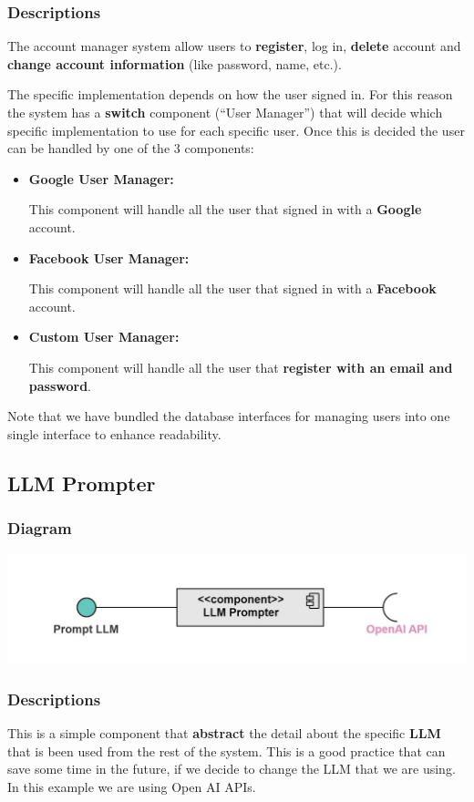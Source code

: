 \documentclass{article}
\begin{document}
\subsubsection{Descriptions}
The account manager system allow users to \textbf{register}, log in, \textbf{delete} account and \textbf{change account information} (like password, name, etc.).

The specific implementation depends on how the user signed in. For this reason the system has a \textbf{switch} component (``User Manager'')
that will decide which specific implementation to use for each specific user. Once this is decided the user
can be handled by one of the 3 components:
\begin{itemize}
    \item \textbf{Google User Manager: }

          This component will handle all the user that signed in with a \textbf{Google} account.
    \item \textbf{Facebook User Manager: }

          This component will handle all the user that signed in with a \textbf{Facebook} account.
    \item \textbf{Custom User Manager: }

          This component will handle all the user that \textbf{register with an email and password}.
\end{itemize}
Note that we have bundled the database interfaces for managing users into one single interface to enhance readability.
\subsection{LLM Prompter}
\subsubsection{Diagram}
\includegraphics[width=\textwidth,height=\textheight,keepaspectratio]{images/component_diagram/llm_prompter.jpg}
\subsubsection{Descriptions}
This is a simple component that \textbf{abstract} the detail about the specific \textbf{LLM} that is been used from the rest of the system.
This is a good practice that can save some time in the future, if we decide to change the LLM that we are using.
In this example we are using Open AI APIs.
\end{document}
